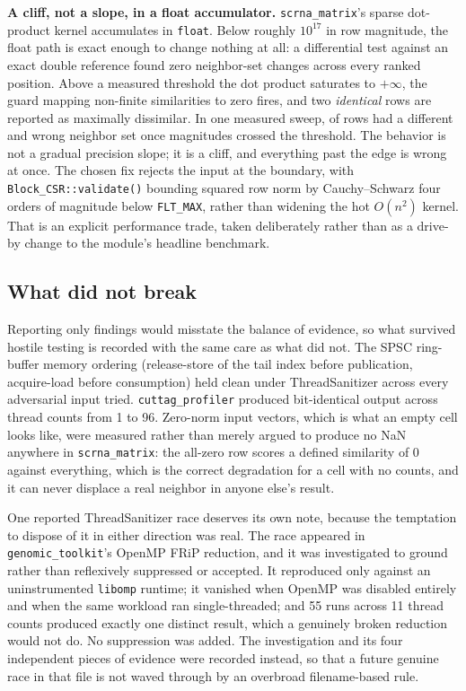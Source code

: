 \documentclass[10pt,twocolumn]{article}
\begin{document}
\textbf{A cliff, not a slope, in a float accumulator.}
\texttt{scrna\_matrix}'s sparse dot-product kernel accumulates in
\texttt{float}. Below roughly $10^{17}$ in row magnitude, the float path is
exact enough to change nothing at all: a differential test against an exact
double reference found zero neighbor-set changes across every ranked
position. Above a measured threshold the dot product saturates to $+\infty$,
the guard mapping non-finite similarities to zero fires, and two
\emph{identical} rows are reported as maximally dissimilar. In one measured
sweep, \FloatCliffRowsWrong{} of \FloatCliffRowsTotal{} rows had a different
and wrong neighbor set once magnitudes crossed the threshold. The behavior is
not a gradual precision slope; it is a cliff, and everything past the edge is
wrong at once. The chosen fix rejects the input at the boundary, with
\texttt{Block\_CSR::validate()} bounding squared row norm by Cauchy--Schwarz
four orders of magnitude below \texttt{FLT\_MAX}, rather than widening the hot
$O(n^2)$ kernel. That is an explicit performance trade, taken deliberately
rather than as a drive-by change to the module's headline benchmark.

\subsection{What did not break}

Reporting only findings would misstate the balance of evidence, so what
survived hostile testing is recorded with the same care as what did not. The
SPSC ring-buffer memory ordering (release-store of the tail index before
publication, acquire-load before consumption) held clean under
ThreadSanitizer across every adversarial input tried.
\texttt{cuttag\_profiler} produced bit-identical output across thread counts
from 1 to 96. Zero-norm input vectors, which is what an empty cell looks
like, were measured rather than merely argued to produce no NaN anywhere in
\texttt{scrna\_matrix}: the all-zero row scores a defined similarity of 0
against everything, which is the correct degradation for a cell with no
counts, and it can never displace a real neighbor in anyone else's result.

One reported ThreadSanitizer race deserves its own note, because the
temptation to dispose of it in either direction was real. The race appeared
in \texttt{genomic\_toolkit}'s OpenMP FRiP reduction, and it was investigated
to ground rather than reflexively suppressed or accepted. It reproduced only
against an uninstrumented \texttt{libomp} runtime; it vanished when OpenMP was
disabled entirely and when the same workload ran single-threaded; and 55 runs
across 11 thread counts produced exactly one distinct result, which a
genuinely broken reduction would not do. No suppression was added. The
investigation and its four independent pieces of evidence were recorded
instead, so that a future genuine race in that file is not waved through by
an overbroad filename-based rule.
\end{document}
